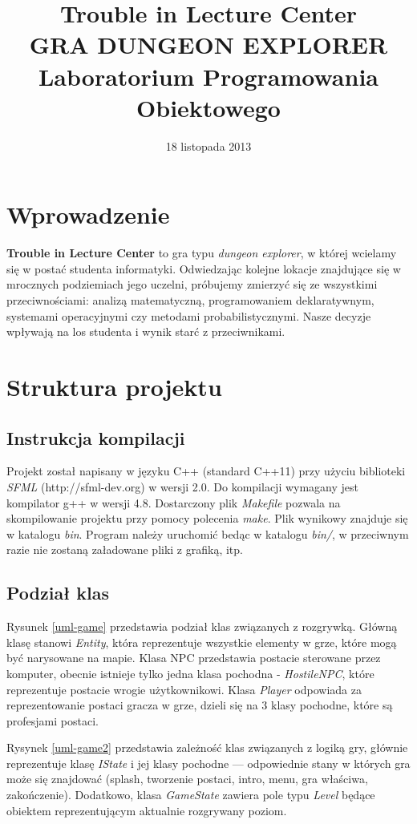 \documentclass[10pt,a4paper]{article}
\author{\authorthing}
\date{18 listopada 2013}
\title{Trouble in Lecture Center\\\small{\MakeUppercase{Gra dungeon explorer}}\\\Large{Laboratorium Programowania Obiektowego}}
\begin{document}
\maketitle


\section{Wprowadzenie}
\textbf{Trouble in Lecture Center} to gra typu \textit{dungeon explorer}, w której wcielamy się w postać studenta informatyki. Odwiedzając kolejne lokacje znajdujące się w mrocznych podziemiach jego uczelni, próbujemy zmierzyć się ze wszystkimi przeciwnościami: analizą matematyczną, programowaniem deklaratywnym, systemami operacyjnymi czy metodami probabilistycznymi. Nasze decyzje wpływają na los studenta i wynik starć z przeciwnikami.


\section{Struktura projektu}
\subsection{Instrukcja kompilacji}
Projekt został napisany w języku C++ (standard C++11) przy użyciu biblioteki \textit{SFML} (http://sfml-dev.org) w wersji 2.0. Do kompilacji wymagany jest kompilator g++ w wersji 4.8. Dostarczony plik \textit{Makefile} pozwala na skompilowanie projektu przy pomocy polecenia \textit{make}. Plik wynikowy znajduje się w katalogu \textit{bin}. Program należy uruchomić bedąc w katalogu \textit{bin/}, w przeciwnym razie nie zostaną załadowane pliki z grafiką, itp.

\subsection{Podział klas}
Rysunek \ref{uml-game} przedstawia podział klas związanych z rozgrywką. Główną klasę stanowi \textit{Entity}, która reprezentuje wszystkie elementy w grze, które mogą być narysowane na mapie. Klasa NPC przedstawia postacie sterowane przez komputer, obecnie istnieje tylko jedna klasa pochodna - \textit{HostileNPC}, które reprezentuje postacie wrogie użytkownikowi. Klasa \textit{Player} odpowiada za reprezentowanie postaci gracza w grze, dzieli się na 3 klasy pochodne, które są profesjami postaci.

Rysynek \ref{uml-game2} przedstawia zależność klas związanych z logiką gry, głównie reprezentuje klasę \textit{IState} i jej klasy pochodne --- odpowiednie stany w których gra może się znajdować (splash, tworzenie postaci, intro, menu, gra właściwa, zakończenie). Dodatkowo, klasa \textit{GameState} zawiera pole typu \textit{Level} będące obiektem reprezentującym aktualnie rozgrywany poziom.
\end{document}
